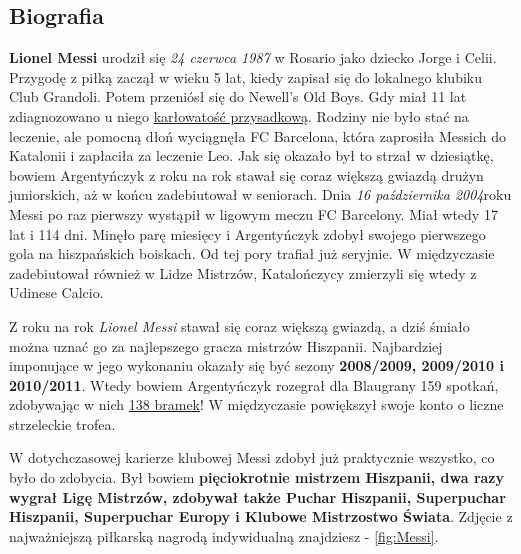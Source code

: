 \subsection{Biografia}
\setlength{\parindent}{20}
\par \textbf{Lionel Messi} urodził się \textit{24 czerwca 1987} w Rosario jako dziecko Jorge i Celii. Przygodę z piłką zaczął w wieku 5 lat, kiedy zapisał się do lokalnego klubiku Club Grandoli. Potem przeniósł się do Newell's Old Boys. Gdy miał 11 lat zdiagnozowano u niego \underline{karłowatość przysadkową}. Rodziny nie było stać na leczenie, ale pomocną dłoń wyciągnęła FC Barcelona, która zaprosiła Messich do Katalonii i zapłaciła za leczenie Leo. Jak się okazało był to strzał w dziesiątkę, bowiem Argentyńczyk z roku na rok stawał się coraz większą gwiazdą drużyn juniorskich, aż w końcu zadebiutował w seniorach. Dnia \textit{16 października 2004}roku Messi po raz pierwszy wystąpił w ligowym meczu FC Barcelony. Miał wtedy 17 lat i 114 dni. Minęło parę miesięcy i Argentyńczyk zdobył swojego pierwszego gola na hiszpańskich boiskach. Od tej pory trafiał już seryjnie. W międzyczasie zadebiutował również w Lidze Mistrzów, Katalończycy zmierzyli się wtedy z Udinese Calcio. \par
Z roku na rok \emph{Lionel Messi} stawał się coraz większą gwiazdą, a dziś śmiało można uznać go za najlepszego gracza mistrzów Hiszpanii. Najbardziej imponujące w jego wykonaniu okazały się być sezony \textbf{2008/2009, 2009/2010 i 2010/2011}. Wtedy bowiem Argentyńczyk rozegrał dla Blaugrany 159 spotkań, zdobywając w nich \underline{138 bramek}! W międzyczasie powiększył swoje konto o liczne strzeleckie trofea. \par
W dotychczasowej karierze klubowej Messi zdobył już praktycznie wszystko, co było do zdobycia. Był bowiem \textbf{pięciokrotnie mistrzem Hiszpanii, dwa razy wygrał Ligę Mistrzów, zdobywał także Puchar Hiszpanii, Superpuchar Hiszpanii, Superpuchar Europy i Klubowe Mistrzostwo Świata}.  Zdjęcie z najważniejszą piłkarską nagrodą indywidualną znajdziesz - \ref{fig:Messi}.